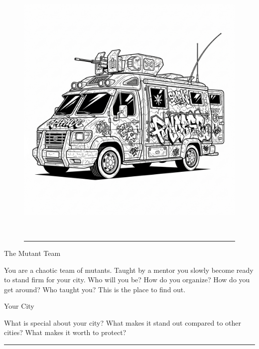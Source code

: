 
\vspace*{\fill}

\begin{figure}[h!]
\centering\includegraphics[height=13cm]{images/van.png}
\vspace{-\baselineskip}\vspace{+0.1pt}
\rule{\linewidth}{2pt}
\end{figure}
\Huge{}The Mutant Team

\normalfont\large
\medskip

You are a chaotic team of mutants. Taught by a mentor you slowly become ready to stand firm for your city. Who will you be? How do you organize? How do you get around? Who taught you? This is the place to find out.

\newpage

\Large{}Your City
\normalfont\large
\medskip

What is special about your city? What makes it stand out compared to other cities? What makes it worth to protect? \rule{0.5\linewidth}{1pt}

\vspace{0.5cm}


